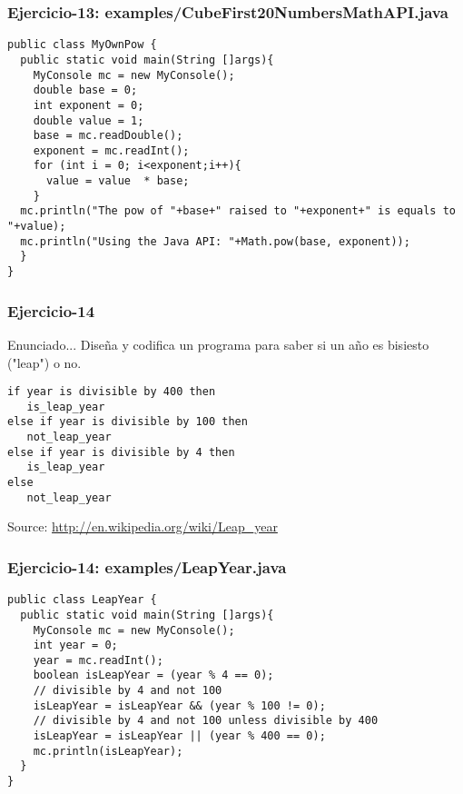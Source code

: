 \documentclass[xcolor=dvipsnames,dvip,notes=show,handout,table]{beamer}
\begin{document}
\begin{frame}[fragile]
\frametitle{Ejercicio-13: examples/CubeFirst20NumbersMathAPI.java}
\tiny
\begin{lstlisting}
public class MyOwnPow {
  public static void main(String []args){
    MyConsole mc = new MyConsole();
    double base = 0;
    int exponent = 0;
    double value = 1;
    base = mc.readDouble();
    exponent = mc.readInt();
    for (int i = 0; i<exponent;i++){
      value = value  * base; 
    }
  mc.println("The pow of "+base+" raised to "+exponent+" is equals to "+value);
  mc.println("Using the Java API: "+Math.pow(base, exponent));
  }
}
\end{lstlisting}
\end{frame}



\begin{frame}[fragile]
\frametitle{Ejercicio-14}
\begin{block}{Enunciado...}
Diseña y codifica un programa para saber si un año es bisiesto ("leap") o no.
\end{block}
\begin{lstlisting}
if year is divisible by 400 then
   is_leap_year
else if year is divisible by 100 then
   not_leap_year
else if year is divisible by 4 then
   is_leap_year
else
   not_leap_year
\end{lstlisting}

Source: \url{http://en.wikipedia.org/wiki/Leap\_year}
\end{frame}


\begin{frame}[fragile]
\frametitle{Ejercicio-14: examples/LeapYear.java}
\scriptsize
\begin{lstlisting}
public class LeapYear {
  public static void main(String []args){
    MyConsole mc = new MyConsole();
    int year = 0;
    year = mc.readInt();
    boolean isLeapYear = (year % 4 == 0);
    // divisible by 4 and not 100
    isLeapYear = isLeapYear && (year % 100 != 0);
    // divisible by 4 and not 100 unless divisible by 400
    isLeapYear = isLeapYear || (year % 400 == 0);
    mc.println(isLeapYear);	
  }
}
\end{lstlisting}
\end{frame}
\end{document}
